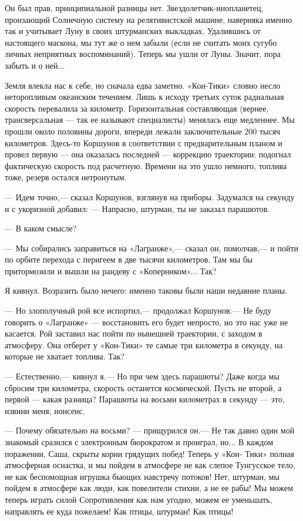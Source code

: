 \documentclass[11pt,a4paper,oneside]{article}
\begin{document}
Он был прав, принципиальной разницы нет. Звездолетчик-инопланетец, пронзающий Солнечную систему на релятивистской машине, наверняка именно так и учитывает Луну в своих штурманских выкладках. Удалившись от настоящего маскона, мы тут же о нем забыли (если не считать моих сугубо личных неприятных воспоминаний). Теперь мы ушли от Луны. Значит, пора забыть и о ней...

Земля влекла нас к себе, но сначала едва заметно. «Кон-Тики» словно несло неторопливым океанским течением. Лишь к исходу третьих суток радиальная скорость перевалила за километр. Горизонтальная составляющая (вернее, трансверсальная — так ее называют специалисты) менялась еще медленнее. Мы прошли около половины дороги, впереди лежали заключительные 200 тысяч километров. Здесь-то Коршунов в соответствии с предварительным планом и провел первую — она оказалась последней — коррекцию траектории: подогнал фактическую скорость под расчетную. Времени на это ушло немного, топлива тоже, резерв остался нетронутым.

— Идем точно,— сказал Коршунов, взглянув на приборы. Задумался на секунду и с укоризной добавил: — Напрасно, штурман, ты не заказал парашютов.

— В каком смысле?

— Мы собирались заправиться на «Лагранже»,— сказал он, помолчав,— и пойти по орбите перехода с перигеем в две тысячи километров. Там мы бы притормозили и вышли на рандеву с «Коперником»... Так?

Я кивнул. Возразить было нечего: именно таковы были наши недавние планы.

— Но злополучный рой все испортил,— продолжал Коршунов.— Не буду говорить о «Лагранже» — восстановить его будет непросто, но это нас уже не касается. Рой заставил нас пойти по нынешней траектории, с заходом в атмосферу. Она отберет у «Кон-Тики» те самые три километра в секунду, на которые не хватает топлива. Так?

— Естественно,— кивнул я.— Но при чем здесь парашюты? Даже когда мы сбросим три километра, скорость останется космической. Пусть не второй, а первой — какая разница? Парашюты на восьми километрах в секунду — это, извини меня, нонсенс.

— Почему обязательно на восьми? — прищурился он.— Не так давно один мой знакомый сразился с электронным бюрократом и проиграл, но... В каждом поражении, Саша, скрыты корни грядущих побед! Теперь у «Кон- Тики» полная атмосферная оснастка, и мы пойдем в атмосфере не как слепое Тунгусское тело, не как беспомощная игрушка бьющих навстречу потоков! Нет, штурман, мы пойдем в атмосфере как люди, как повелители стихии, а не ее рабы! Мы можем теперь играть силой Сопротивления как нам угодно, можем ее уменьшать, направлять ее куда пожелаем! Как птицы, штурман! Как птицы!
\end{document}
